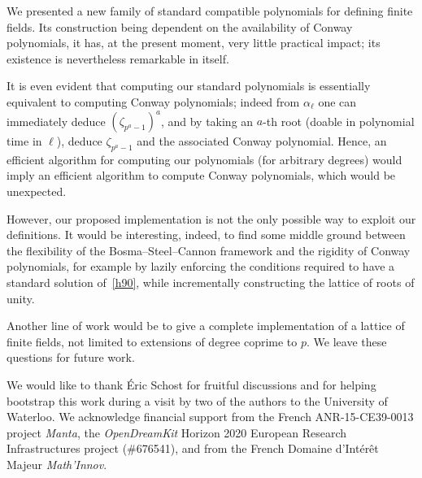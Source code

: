 \documentclass[sigconf]{acmart}
\begin{document}
We presented a new family of standard compatible polynomials for
defining finite fields. %
Its construction being dependent on the availability of Conway
polynomials, it has, at the present moment, very little practical
impact; its existence is nevertheless remarkable in itself.

It is even evident that computing our standard polynomials is
essentially equivalent to computing Conway polynomials; indeed from
$\alpha_\ell$ one can immediately deduce $(\zeta_{p^a-1})^a$, and by
taking an $a$-th root (doable in polynomial time in $\ell$), deduce
$\zeta_{p^a-1}$ and the associated Conway polynomial. %
Hence, an efficient algorithm for computing our polynomials (for
arbitrary degrees) would imply an efficient algorithm to compute
Conway polynomials, which would be unexpected.

However, our proposed implementation is not the only possible way to
exploit our definitions. %
It would be interesting, indeed, to find some middle ground between
the flexibility of the Bosma--Steel--Cannon framework and the rigidity
of Conway polynomials, for example by lazily enforcing the conditions
required to have a standard solution of~\eqref{h90}, while
incrementally constructing the lattice of roots of unity. %

Another line of work would be to give a complete implementation of a
lattice of finite fields, not limited to extensions of degree coprime
to $p$. %
We leave these questions for future work.


\begin{acks}
We would like to thank \'Eric Schost for fruitful discussions and for
helping bootstrap this work during a visit by two of the authors to
the University of Waterloo. %
We acknowledge financial support from the French ANR-15-CE39-0013
project \emph{Manta}, the \emph{OpenDreamKit} Horizon 2020 European
Research Infrastructures project (\#676541), and from the French
Domaine d'Int\'er\^et Majeur \emph{Math'Innov}.
\end{acks}


\balance

\end{document}
